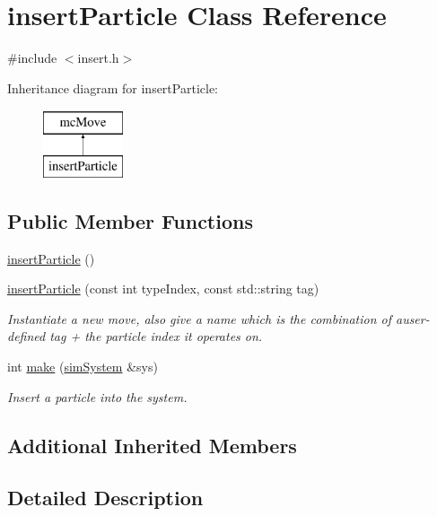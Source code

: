\hypertarget{classinsert_particle}{}\section{insert\+Particle Class Reference}
\label{classinsert_particle}


{\ttfamily \#include $<$insert.\+h$>$}

Inheritance diagram for insert\+Particle\+:\begin{figure}[H]
\begin{center}
\leavevmode
\includegraphics[height=2.000000cm]{classinsert_particle}
\end{center}
\end{figure}
\subsection*{Public Member Functions}
\begin{DoxyCompactItemize}
\item 
\hyperlink{classinsert_particle_adc56d982ad9d43537aea2744d13c3471}{insert\+Particle} ()
\item 
\hyperlink{classinsert_particle_af528d2c24fff7bea0701b014ae2fa5e4}{insert\+Particle} (const int type\+Index, const std\+::string tag)
\begin{DoxyCompactList}\small\item\em Instantiate a new move, also give a name which is the combination of auser-\/defined tag + the particle index it operates on. \end{DoxyCompactList}\item 
int \hyperlink{classinsert_particle_ad81c09b735d1acea65758242d5c5d595}{make} (\hyperlink{classsim_system}{sim\+System} \&sys)
\begin{DoxyCompactList}\small\item\em Insert a particle into the system. \end{DoxyCompactList}\end{DoxyCompactItemize}
\subsection*{Additional Inherited Members}


\subsection{Detailed Description}


